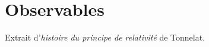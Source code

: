 
\chapter{Observables}
Extrait d'{\it histoire du principe de relativité} de {\sc Tonnelat}.
%

\newpage
%
%
%
%
%
%
%
%
%
